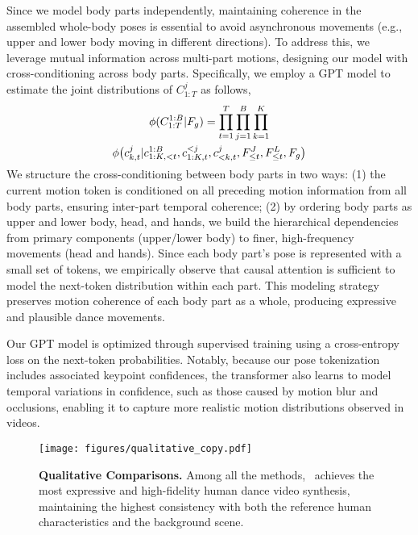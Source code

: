 Since we model body parts independently, maintaining coherence in the assembled whole-body poses is essential to avoid asynchronous movements (e.g., upper and lower body moving in different directions). To address this, we leverage mutual information across multi-part motions, designing our model with cross-conditioning across body parts. Specifically, we employ a GPT model to estimate the joint distributions of $C^j_{1:T}$ as follows,
\vspace{-3mm}
\begin{gather}
\phi(C^{1:B}_{1:T} | F_g) = \prod_{t=1}^{T}\prod_{j=1}^{B} \prod_{k=1}^{K} \nonumber\\ \phi\bigl (c^j_{k,t} | c^{1:B}_{1:K, <t}, c^{<j}_{1:K, t}, c^{j}_{<k, t}, F^{J}_{\leq t}, F^{L}_{\leq t}, F_g \bigr )
\vspace{-2mm}
\end{gather}

We structure the cross-conditioning between body parts in two ways: (1) the current motion token is conditioned on all preceding motion information from all body parts, ensuring inter-part temporal coherence; (2) by ordering body parts as upper and lower body, head, and hands, we build the hierarchical dependencies from primary components (upper/lower body) to finer, high-frequency movements (head and hands). Since each body part’s pose is represented with a small set of tokens, we empirically observe that causal attention is sufficient to model the next-token distribution within each part. This modeling strategy preserves motion coherence of each body part as a whole, producing expressive and plausible dance movements.  

Our GPT model is optimized through supervised training using a cross-entropy loss on the next-token probabilities. Notably, because our pose tokenization includes associated keypoint confidences, the transformer also learns to model temporal variations in confidence, such as those caused by motion blur and occlusions, enabling it to capture more realistic motion distributions observed in videos.

\begin{figure*}[t!]\vspace{-5pt}
\centering
\vspace{-2mm}
 \texttt{[image: figures/qualitative\_copy.pdf]}
   \caption{\textbf{Qualitative Comparisons.} Among all the methods, \papername~achieves the most expressive and high-fidelity human dance video synthesis, maintaining the highest consistency with both the reference human characteristics and the background scene.
   }
   \vspace{-4mm}
    \label{fig:baselines}
\end{figure*}

